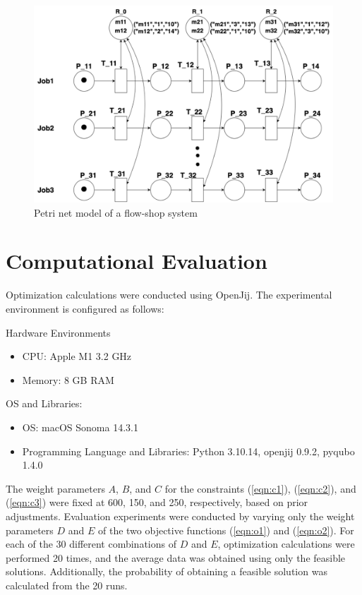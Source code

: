 \documentclass[conference]{IEEEtran}
\begin{document}
\begin{figure}[htbp]
\centerline{\includegraphics[scale=0.3]{./fig/fsp.pdf}}
\caption{Petri net model of a flow-shop system}
\label{fig:fig1}
\end{figure}


\section{Computational Evaluation} 
Optimization calculations were conducted using OpenJij. The experimental environment is configured as follows:

Hardware Environments 
\begin{itemize} 
\item CPU: Apple M1 3.2 GHz 
\item Memory: 8 GB RAM 
\end{itemize}

OS and Libraries: 
\begin{itemize} 
\item OS: macOS Sonoma 14.3.1 
\item Programming Language and Libraries: Python 3.10.14, openjij 0.9.2, pyqubo 1.4.0 
\end{itemize}

The weight parameters $A$, $B$, and $C$ for the constraints (\ref{eqn:c1}), (\ref{eqn:c2}), and (\ref{eqn:c3}) were fixed at 600, 150, and 250, respectively, based on prior adjustments. Evaluation experiments were conducted by varying only the weight parameters $D$ and $E$ of the two objective functions (\ref{eqn:o1}) and (\ref{eqn:o2}). 
For each of the 30 different combinations of $D$ and $E$, optimization calculations were performed 20 times, and the average data was obtained using only the feasible solutions. 
Additionally, the probability of obtaining a feasible solution was calculated from the 20 runs.
\end{document}
